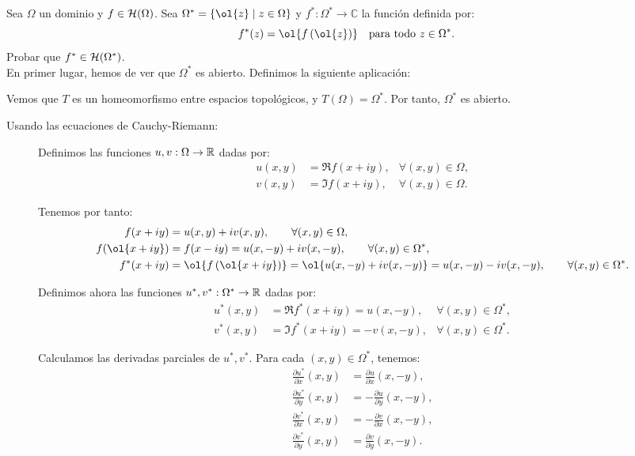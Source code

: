 \begin{ejercicio}
    Sea $\Omega$ un dominio y $f \in \mathcal{H}(\Omega)$. Sea $\Omega^* = \{\ol{z} \mid z \in \Omega\}$ y $f^* : \Omega^* \to \mathbb{C}$ la función definida por:
    \[
        f^*(z) = \ol{f\left(\ol{z}\right)} \quad \text{para todo } z \in \Omega^*.
    \]
    Probar que $f^* \in \mathcal{H}(\Omega^*)$.\\

    En primer lugar, hemos de ver que $\Omega^*$ es abierto. Definimos la siguiente aplicación:

    Vemos que $T$ es un homeomorfismo entre espacios topológicos, y $T(\Omega)=\Omega^*$. Por tanto, $\Omega^*$ es abierto.
    \begin{description}
        \item[Usando las ecuaciones de Cauchy-Riemann:]
        
        Definimos las funciones $u,v:\Omega\to\mathbb{R}$ dadas por:
        \begin{align*}
            u(x,y) &= \Re f(x+iy),&\forall (x,y)\in\Omega,\\
            v(x,y) &= \Im f(x+iy),&\forall (x,y)\in\Omega.
        \end{align*}

        Tenemos por tanto:
        \begin{align*}
            f(x+iy) &= u(x,y) + iv(x,y),\qquad \forall (x,y)\in\Omega,\\
            f(\ol{x+iy}) &= f(x-iy) = u(x,-y) + iv(x,-y),\qquad \forall (x,y)\in\Omega^*,\\
            f^*(x+iy) &= \ol{f\left(\ol{x+iy}\right)} = \ol{u(x,-y) + iv(x,-y)} = u(x,-y) - iv(x,-y),\qquad \forall (x,y)\in\Omega^*.
        \end{align*}

        Definimos ahora las funciones $u^*,v^*:\Omega^*\to\mathbb{R}$ dadas por:
        \begin{align*}
            u^*(x,y) &= \Re f^*(x+iy)=u(x,-y),&\forall (x,y)\in\Omega^*,\\
            v^*(x,y) &= \Im f^*(x+iy)=-v(x,-y),&\forall (x,y)\in\Omega^*.
        \end{align*}

        Calculamos las derivadas parciales de $u^*,v^*$. Para cada $(x,y)\in\Omega^*$, tenemos:
        \begin{align*}
            \frac{\partial u^*}{\partial x}(x,y) &= \frac{\partial u}{\partial x}(x,-y),\\
            \frac{\partial u^*}{\partial y}(x,y) &= -\frac{\partial u}{\partial y}(x,-y),\\
            \frac{\partial v^*}{\partial x}(x,y) &= -\frac{\partial v}{\partial x}(x,-y),\\
            \frac{\partial v^*}{\partial y}(x,y) &= \frac{\partial v}{\partial y}(x,-y).
        \end{align*}


\end{description}
\end{ejercicio}
